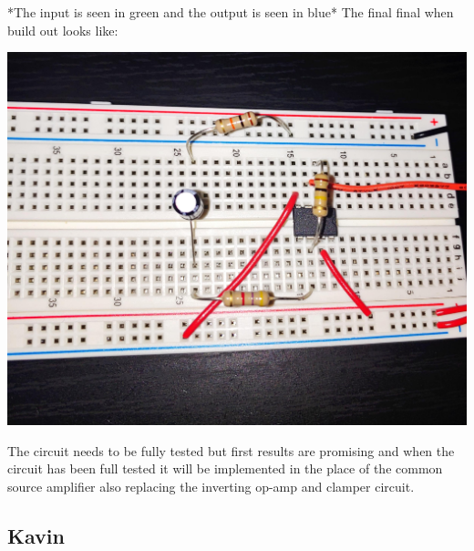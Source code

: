 \documentclass{article}
\begin{document}
*The input is seen in green and the output is seen in blue*
\newpage
The final final when build out looks like:

\includegraphics[width=\textwidth]{images/2804_Amp.jpg}

The circuit needs to be fully tested but first results are promising and when the circuit has been full tested it will be implemented in the place of the common source amplifier also replacing the inverting op-amp and clamper circuit.
\newpage
\subsection{Kavin}
\end{document}
